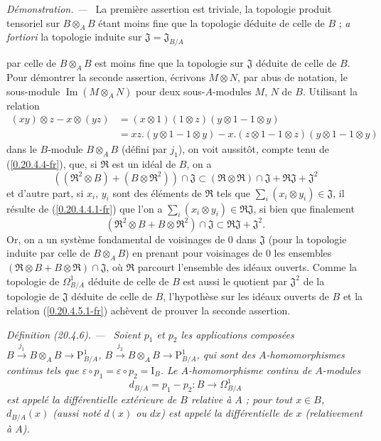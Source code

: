 \documentclass[10pt,oneside]{book}
\makeatletter
\newcommand{\sref}[1]{(\ref{#1})}
\newcommand{\setmanualcurrentlabel}[1]{\def\@currentlabel{#1}}
\newcommand{\oldpage}[2][]{%
  \setcounter{footnote}{0}%
  \marginpar{\scriptsize\textbf{#1}~|~#2}\ignorespaces}
\newenvironment{definition}[1][]{%
  \setmanualcurrentlabel{#1}\par\medskip\noindent\itshape Définition (#1). ---\ }{\par}
\newenvironment{proof}{%
  \par\medskip\noindent\textit{Démonstration. ---\ }}{\par}
\makeatother
\begin{document}
\begin{proof}
La première assertion est triviale, la topologie produit tensoriel sur
$B\otimes_A B$ étant moins fine que la topologie déduite de celle de $B$ ;
\emph{a fortiori} la topologie induite sur
$\mathfrak{J}=\mathfrak{J}_{B/A}$

\oldpage[0\textsubscript{IV-1}]{125}
par celle de $B\otimes_A B$ est moins fine que la topologie sur $\mathfrak{J}$
déduite de celle de $B$. Pour démontrer la seconde assertion, écrivons
$M\otimes N$, par abus de notation, le sous-module
$\operatorname{Im}(M\otimes_A N)$ pour deux sous-$A$-modules $M$, $N$ de $B$.
Utilisant la relation
\[
\begin{aligned}
  (xy)\otimes z-x\otimes(yz)
  &=(x\otimes1)(1\otimes z)(y\otimes1-1\otimes y)\\
  &=xz.(y\otimes1-1\otimes y)
    -x.(z\otimes1-1\otimes z)(y\otimes1-1\otimes y)
\end{aligned}
\]
dans le $B$-module $B\otimes_A B$ (défini par $j_1$), on voit aussitôt,
compte tenu de \sref{0.20.4.4-fr}, que, si $\mathfrak{R}$ est un idéal de
$B$, on a
\[
  ((\mathfrak{R}^2\otimes B)+(B\otimes\mathfrak{R}^2))\cap\mathfrak{J}
  \subset(\mathfrak{R}\otimes\mathfrak{R})\cap\mathfrak{J}
  +\mathfrak{R}\mathfrak{J}+\mathfrak{J}^2
\]
et d'autre part, si $x_i$, $y_i$ sont des éléments de $\mathfrak{R}$ tels
que $\sum_i(x_i\otimes y_i)\in\mathfrak{J}$, il résulte de
\sref{0.20.4.4.1-fr} que l'on a
$\sum_i(x_i\otimes y_i)\in\mathfrak{R}\mathfrak{J}$, si bien que finalement
\begin{equation}
\tag{20.4.5.1}
\label{0.20.4.5.1-fr}
  (\mathfrak{R}^2\otimes B+B\otimes\mathfrak{R}^2)\cap\mathfrak{J}
  \subset\mathfrak{R}\mathfrak{J}+\mathfrak{J}^2.
\end{equation}
Or, on a un système fondamental de voisinages de $0$ dans $\mathfrak{J}$
(pour la topologie induite par celle de $B\otimes_A B$) en prenant pour
voisinages de $0$ les ensembles
$(\mathfrak{R}\otimes B+B\otimes\mathfrak{R})\cap\mathfrak{J}$, où
$\mathfrak{R}$ parcourt l'ensemble des idéaux ouverts. Comme la topologie de
$\Omega^1_{B/A}$ déduite de celle de $B$ est aussi le quotient par
$\mathfrak{J}^2$ de la topologie de $\mathfrak{J}$ déduite de celle de $B$,
l'hypothèse sur les idéaux ouverts de $B$ et la relation
\sref{0.20.4.5.1-fr} achèvent de prouver la seconde assertion.
\end{proof}

\begin{definition}[20.4.6]
\label{0.20.4.6-fr}
Soient $p_1$ et $p_2$ les applications composées
$B\xrightarrow{j_1}B\otimes_A B\to\mathrm{P}^1_{B/A}$,
$B\xrightarrow{j_2}B\otimes_A B\to\mathrm{P}^1_{B/A}$, qui sont des
$A$-homomorphismes continus tels que
$\varepsilon\circ p_1=\varepsilon\circ p_2=\mathrm{I}_B$. Le
$A$-homomorphisme continu de $A$-modules
\begin{equation}
\tag{20.4.6.1}
\label{0.20.4.6.1-fr}
  d_{B/A}=p_1-p_2:B\to\Omega^1_{B/A}
\end{equation}
est appelé la \emph{différentielle extérieure de $B$ relative à $A$} ; pour
tout $x\in B$, $d_{B/A}(x)$ (aussi noté $d(x)$ ou $dx$) est appelé la
\emph{différentielle de $x$} (relativement à $A$).
\end{definition}
\end{document}

